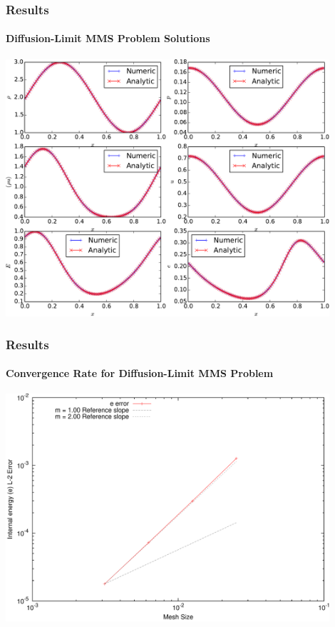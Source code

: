 \documentclass[xcolor=dvipsnames,fontsize=8pt]{beamer}
\begin{document}
\begin{frame}
\frametitle{Results}
\framesubtitle{Diffusion-Limit MMS Problem Solutions}

\begin{center}
\includegraphics[width=0.9\textwidth]{./figures/MMS_solution.pdf}
\end{center}

\end{frame}
\begin{frame}
\frametitle{Results}
\framesubtitle{Convergence Rate for Diffusion-Limit MMS Problem}

\begin{center}
\includegraphics[width=0.9\textwidth]{./figures/MMS_convergence.pdf}
\end{center}

\end{frame}
\end{document}
